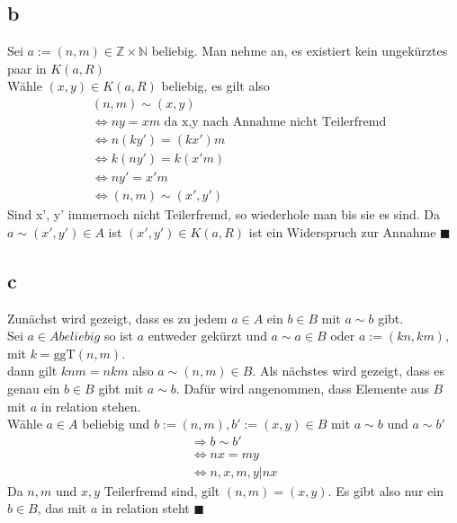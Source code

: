 \documentclass{article}
\begin{document}
\subsection*{b}
Sei $a:=(n,m)\in \mathbb Z\times\mathbb N$ beliebig.
Man nehme an, es existiert kein ungekürztes paar in $K(a, R)$\\
Wähle $(x,y)\in K(a, R)$ beliebig, es gilt also
\begin{align*}
    &(n,m)\sim(x,y)\\
    &\Leftrightarrow ny=xm \text{ da x,y nach Annahme nicht Teilerfremd}\\
    &\Leftrightarrow n(ky')=(kx')m\\
    &\Leftrightarrow k(ny')=k(x'm)\\
    &\Leftrightarrow ny'=x'm\\
    &\Leftrightarrow (n,m) \sim (x',y')
\end{align*}
Sind x', y' immernoch nicht Teilerfremd, so wiederhole man bis sie es sind.
Da $a\sim(x',y')\in A$ ist $(x',y')\in K(a,R)$ ist ein Widerspruch zur
Annahme $\blacksquare$
\subsection*{c}
Zunächst wird gezeigt, dass es zu jedem $a\in A$ ein $b\in B$ mit $a\sim b$ gibt.\\
Sei $a\in A beliebig$ so ist $a$ entweder gekürzt und $a\sim a\in B$ oder
$a:=(kn, km)$, mit $k = \text{ggT}(n,m)$.\\
dann gilt $kn m = n km$ also $a\sim (n,m)\in B$.
Als nächstes wird gezeigt, dass es genau ein $b\in B$ gibt mit $a\sim b$.
Dafür wird angenommen, dass Elemente aus $B$ mit $a$ in relation stehen.\\
Wähle $a\in A$ beliebig und $b:=(n,m), b':=(x,y)\in B$ mit $a\sim b$ und $a\sim b'$
\begin{align*}
    \Rightarrow b\sim b'\\
    \Leftrightarrow nx = my\\
    \Leftrightarrow n,x,m,y|nx
\end{align*}
Da $n,m$ und $x,y$ Teilerfremd sind, gilt $(n,m)=(x,y)$.
Es gibt also nur ein $b\in B$, das mit $a$ in relation steht
$\blacksquare$
\end{document}
